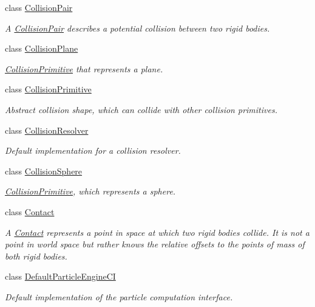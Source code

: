 \begin{DoxyCompactItemize}
class \mbox{\hyperlink{classr3_1_1_collision_pair}{Collision\+Pair}}
\begin{DoxyCompactList}\small\item\em A \mbox{\hyperlink{classr3_1_1_collision_pair}{Collision\+Pair}} describes a potential collision between two rigid bodies. \end{DoxyCompactList}\item 
class \mbox{\hyperlink{classr3_1_1_collision_plane}{Collision\+Plane}}
\begin{DoxyCompactList}\small\item\em \mbox{\hyperlink{classr3_1_1_collision_primitive}{Collision\+Primitive}} that represents a plane. \end{DoxyCompactList}\item 
class \mbox{\hyperlink{classr3_1_1_collision_primitive}{Collision\+Primitive}}
\begin{DoxyCompactList}\small\item\em Abstract collision shape, which can collide with other collision primitives. \end{DoxyCompactList}\item 
class \mbox{\hyperlink{classr3_1_1_collision_resolver}{Collision\+Resolver}}
\begin{DoxyCompactList}\small\item\em Default implementation for a collision resolver. \end{DoxyCompactList}\item 
class \mbox{\hyperlink{classr3_1_1_collision_sphere}{Collision\+Sphere}}
\begin{DoxyCompactList}\small\item\em \mbox{\hyperlink{classr3_1_1_collision_primitive}{Collision\+Primitive}}, which represents a sphere. \end{DoxyCompactList}\item 
class \mbox{\hyperlink{classr3_1_1_contact}{Contact}}
\begin{DoxyCompactList}\small\item\em A \mbox{\hyperlink{classr3_1_1_contact}{Contact}} represents a point in space at which two rigid bodies collide. It is not a point in world space but rather knows the relative offsets to the points of mass of both rigid bodies. \end{DoxyCompactList}\item 
class \mbox{\hyperlink{classr3_1_1_default_particle_engine_c_i}{Default\+Particle\+Engine\+CI}}
\begin{DoxyCompactList}\small\item\em Default implementation of the particle computation interface. \end{DoxyCompactList}\item 

\end{DoxyCompactItemize}
